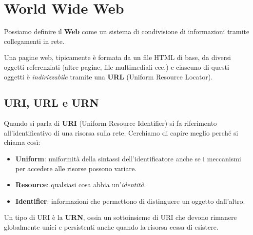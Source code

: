 \section{World Wide Web}
Possiamo definire il \textbf{Web} come un sistema di condivisione di informazioni tramite
collegamenti in rete.

Una pagine web, tipicamente è formata da un file HTML di base, da diversi oggetti referenziati
(altre pagine, file multimediali ecc.) e ciascuno di questi oggetti è \emph{indirizzabile} tramite
una \textbf{URL} (Uniform Resource Locator).

\subsection{URI, URL e URN}
Quando si parla di \textbf{URI} (Uniform Resource Identifier) si fa riferimento all'identificativo
di una risorsa sulla rete. Cerchiamo di capire meglio perché si chiama così:
\begin{itemize}
	\item \textbf{Uniform}: uniformità della sintassi dell'identificatore anche se i meccanismi
		per accedere alle risorse possono variare.
	\item \textbf{Resource}: qualsiasi cosa abbia un'\emph{identità}.
	\item \textbf{Identifier}: informazioni che permettono di distinguere un oggetto dall'altro.
\end{itemize}
Un tipo di URI è la \textbf{URN}, ossia un sottoinsieme di URI che devono rimanere globalmente
unici e persistenti anche quando la risorsa cessa di esistere.

